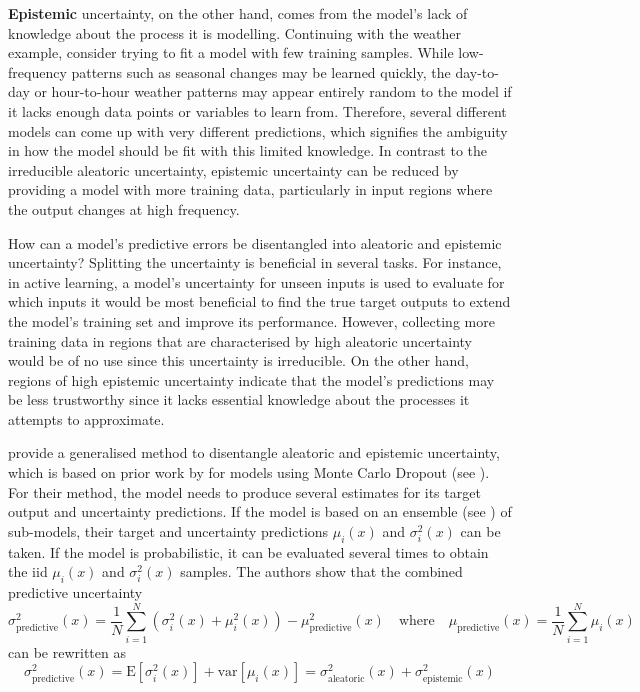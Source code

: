 \textbf{Epistemic} uncertainty, on the other hand, comes from the model's lack of knowledge about the process it is modelling. Continuing with the weather example, consider trying to fit a model with few training samples. While low-frequency patterns such as seasonal changes may be learned quickly, the day-to-day or hour-to-hour weather patterns may appear entirely random to the model if it lacks enough data points or variables to learn from. Therefore, several different models can come up with very different predictions, which signifies the ambiguity in how the model should be fit with this limited knowledge. In contrast to the irreducible aleatoric uncertainty, epistemic uncertainty can be reduced by providing a model with more training data, particularly in input regions where the output changes at high frequency.

\newpar How can a model's predictive errors be disentangled into aleatoric and epistemic uncertainty? Splitting the uncertainty is beneficial in several tasks. For instance, in active learning, a model's uncertainty for unseen inputs is used to evaluate for which inputs it would be most beneficial to find the true target outputs to extend the model's training set and improve its performance. However, collecting more training data in regions that are characterised by high aleatoric uncertainty would be of no use since this uncertainty is irreducible. On the other hand, regions of high epistemic uncertainty indicate that the model's predictions may be less trustworthy since it lacks essential knowledge about the processes it attempts to approximate.

\textcite{uncertainty-disentanglement-2022} provide a generalised method to disentangle aleatoric and epistemic uncertainty, which is based on prior work by \textcite{bayesian-deep-uncertainty-2017} for models using Monte Carlo Dropout (see ). For their method, the model needs to produce several estimates for its target output and uncertainty predictions. If the model is based on an ensemble (see ) of sub-models, their target and uncertainty predictions $\mu_i(x)$ and $\sigma^2_i(x)$ can be taken. If the model is probabilistic, it can be evaluated several times to obtain the iid $\mu_i(x)$ and $\sigma^2_i(x)$ samples. The authors show that the combined predictive uncertainty
\begin{equation*}
    \sigma^2_{\text{predictive}}(x) = \frac{1}{N} \sum_{i=1}^{N} \left( \sigma^2_i(x) + \mu^2_i(x) \right) - \mu^2_{\text{predictive}}(x) \quad \text{where} \quad \mu_{\text{predictive}}(x) = \frac{1}{N} \sum_{i=1}^{N} \mu_i(x)
\end{equation*}
can be rewritten as
\begin{equation} \label{eq:uncertainty-disentanglement}
    \sigma^2_{\text{predictive}}(x) = \text{E}[ \sigma^2_i(x) ] + \text{var}[ \mu_i(x) ] = \sigma^2_{\text{aleatoric}}(x) + \sigma^2_{\text{epistemic}}(x)
\end{equation}

